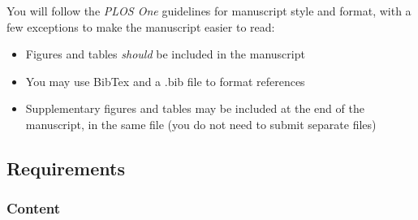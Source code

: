 \documentclass[11pt]{article}
\begin{document}
\noindent You will follow the \textit{PLOS One} guidelines for manuscript style and format, with a few exceptions to make the manuscript easier to read:
\begin{itemize}
\item Figures and tables \textit{should} be included in the manuscript
\item You may use BibTex and a .bib file to format references
\item Supplementary figures and tables may be included at the end of the manuscript, in the same file (you do not need to submit separate files)
\end{itemize}

\subsection*{Requirements}

\subsubsection*{Content}
\end{document}
